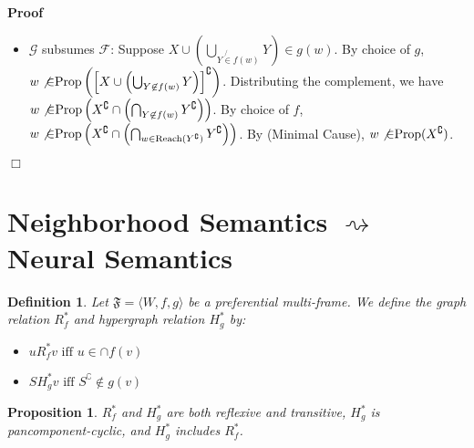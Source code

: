 \documentclass{article}
\newcommand{\infixiff}{\text{ iff }}
\newcommand{\nin}{\not\in}
\newcommand{\tmop}[1]{\ensuremath{\operatorname{#1}}}
\newenvironment{proof}{\noindent\textbf{Proof\ }}{\hspace*{\fill}$\Box$\medskip}
\newtheorem{definition}{Definition}
\newtheorem{proposition}{Proposition}
\providecommand{\infixiff}{\mathbin{\text{ iff }}}
\newcommand{\Reach}{\textsf{\tmop{Reach}}}
\newcommand{\Prop}{\textsf{\tmop{Prop}}}
\begin{document}
\begin{proof}
\begin{itemize}
    \item $\mathcal{G}$ subsumes $\mathcal{F}$: Suppose $X \cup \left(
    \bigcup_{Y \not{\in} f (w)} Y \right) \in g (w)$. By choice of $g$, $w
    \not{\in} \Prop \left( \left[ X \cup \left( \bigcup_{Y \not{\in} f (w)} Y
    \right) \right]^{\complement} \right)$. Distributing the complement, we
    have $w \not{\in} \Prop \left( X^{\complement} \cap \left( \bigcap_{Y
    \not{\in} f (w)} Y^{\complement} \right) \right)$. By choice of $f$, $w
    \not{\in} \Prop \left( X^{\complement} \cap \left( \bigcap_{w \in \Reach
    (Y^{\complement})} Y^{\complement} \right) \right)$. By (Minimal Cause),
    $w \not{\in} \Prop (X^{\complement})$.
  \end{itemize}
  
\end{proof}

\section{Neighborhood Semantics $\rightsquigarrow$ Neural Semantics}

\begin{definition}
  Let $\mathfrak{F}= \langle W, f, g \rangle$ be a preferential multi-frame.
  We define the graph relation $R_f^{\ast}$ and hypergraph relation
  $H_g^{\ast}$ by:
  \begin{itemize}
    \item $u R_f^{\ast} v \infixiff u \in \cap f (v)$
    
    \item $S H_g^{\ast} v \infixiff S^{\complement} \nin g (v)$
  \end{itemize}
\end{definition}

\begin{proposition}
  $R_f^{\ast}$ and $H_g^{\ast}$ are both reflexive and transitive,
  $H_g^{\ast}$ is pancomponent-cyclic, and $H_g^{\ast}$ includes $R_f^{\ast}$.
\end{proposition}
\end{document}
